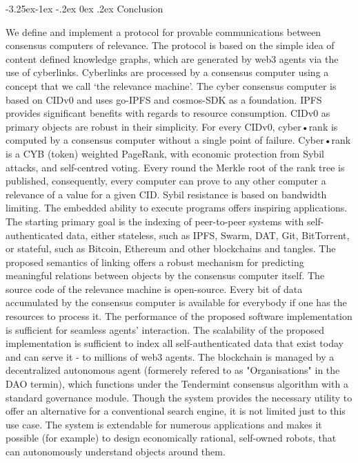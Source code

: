 \documentclass[8pt,oneside]{amsart}
\makeatletter
\renewcommand\subsection{\@startsection{subsection}{2}{\z@}%
                                     {-3.25ex\@plus -1ex \@minus -.2ex}%
                                     {0ex \@plus .2ex}%
                                     {\play\Large}}%
\newcommand{\titleSection}[1]{\subsection{#1}}
\newcommand{\code}[1]{{\PlayBold #1}}
\makeatother
\begin{document}
\begin{Abstract}
\titleSection{Conclusion}\label{Conclusion}

We define and implement a protocol for provable communications between consensus computers of relevance.
The protocol is based on the simple idea of content defined knowledge graphs, which are generated by web3 agents via the use of cyberlinks.
Cyberlinks are processed by a consensus computer using a concept that we call ‘the relevance machine’.
The \code{cyber} consensus computer is based on \code{CIDv0} and uses \code{go-IPFS} and \code{cosmos-SDK} as a foundation. IPFS provides significant benefits with regards to resource consumption. CIDv0 as primary objects are robust in their simplicity. For every CIDv0, cyber•rank is computed by a consensus computer without a single point of failure. Cyber•rank is a CYB (token) weighted PageRank, with economic protection from Sybil attacks, and self-centred voting. Every round the Merkle root of the rank tree is published, consequently, every computer can prove to any other computer a relevance of a value for a given CID. Sybil resistance is based on bandwidth limiting. The embedded ability to execute programs offers inspiring applications. The starting primary goal is the indexing of peer-to-peer systems with self-authenticated data, either stateless, such as IPFS, Swarm, DAT, Git, BitTorrent, or stateful, such as Bitcoin, Ethereum and other blockchains and tangles. The proposed semantics of linking offers a robust mechanism for predicting meaningful relations between objects by the consensus computer itself. The source code of the relevance machine is open-source. Every bit of data accumulated by the consensus computer is available for everybody if one has the resources to process it. The performance of the proposed software implementation is sufficient for seamless agents' interaction. The scalability of the proposed implementation is sufficient to index all self-authenticated data that exist today and can serve it - to millions of web3 agents. The blockchain is managed by a decentralized autonomous agent (formerely refered to as "Organisations" in the DAO termin), which functions under the Tendermint consensus algorithm with a standard governance module. Though the system provides the necessary utility to offer an alternative for a conventional search engine, it is not limited just to this use case. The system is extendable for numerous applications and makes it possible (for example) to design economically rational, self-owned robots, that can autonomously understand objects around them.


\end{Abstract}
\end{document}
